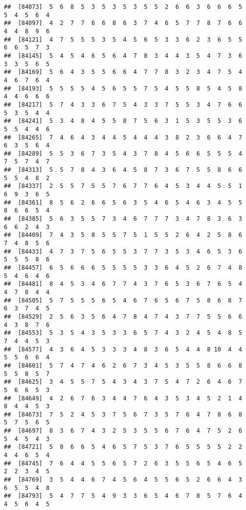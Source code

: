 \documentclass[
]{book}
\begin{document}
\begin{verbatim}
##  [84073]  5  6  8  5  3  5  3  5  3  5  5  2  6  6  3  6  6  6  5  5  4  5  6  4
##  [84097]  4  2  7  7  6  6  8  6  3  7  4  6  5  7  7  8  7  6  6  4  4  8  9  6
##  [84121]  4  7  5  5  5  3  5  4  5  6  5  3  3  6  2  3  6  5  5  6  6  5  7  3
##  [84145]  5  4  5  4  6  5  6  4  7  8  3  4  4  3  5  4  7  3  6  3  3  5  6  5
##  [84169]  5  6  4  3  5  5  6  6  4  7  7  8  3  2  3  4  7  5  4  4  6  7  6  4
##  [84193]  5  5  5  5  4  5  6  5  5  7  5  4  5  5  8  5  4  5  8  4  4  6  6  6
##  [84217]  5  7  4  3  3  6  7  5  4  3  3  7  5  5  3  4  7  6  6  5  3  5  4  4
##  [84241]  5  3  4  8  4  5  5  8  7  5  6  3  1  5  3  5  5  3  6  5  5  4  4  6
##  [84265]  7  4  6  4  3  4  4  5  4  4  4  3  8  2  3  6  6  4  7  6  3  5  6  4
##  [84289]  5  5  3  6  7  3  5  4  3  7  8  4  5  6  6  5  5  5  4  7  5  7  4  7
##  [84313]  5  5  7  8  4  3  6  4  5  8  7  3  6  7  5  5  8  6  6  5  5  4  8  2
##  [84337]  2  5  5  7  5  5  7  6  7  7  6  4  5  3  4  4  5  5  1  6  9  3  6  5
##  [84361]  8  5  6  2  6  6  5  6  3  5  4  6  5  4  6  3  4  5  5  8  6  6  5  4
##  [84385]  5  6  3  5  5  7  3  4  6  7  7  7  3  4  7  8  3  6  3  6  6  2  4  3
##  [84409]  7  4  3  5  8  5  5  7  5  1  5  5  2  6  4  2  5  8  6  7  4  8  5  6
##  [84433]  4  7  3  7  5  6  5  5  3  7  7  3  5  3  4  6  5  3  6  5  5  5  8  6
##  [84457]  6  5  6  6  6  5  5  5  5  3  3  6  4  5  2  6  7  4  8  5  4  6  4  6
##  [84481]  8  4  5  3  4  6  7  7  4  3  7  6  5  3  6  7  6  5  4  4  7  8  4  4
##  [84505]  5  7  5  5  5  6  5  4  6  7  6  5  6  7  5  8  6  8  7  6  3  7  4  5
##  [84529]  2  5  6  3  5  6  4  7  8  4  7  4  3  7  7  5  5  6  6  4  3  8  7  6
##  [84553]  5  3  5  4  3  5  3  3  6  5  7  4  3  2  4  5  4  8  5  7  4  4  5  3
##  [84577]  4  3  6  4  5  3  3  3  4  8  3  6  5  4  4  8 10  4  4  5  5  6  6  4
##  [84601]  5  7  4  7  4  6  2  6  7  3  4  5  3  5  5  8  6  6  8  5  5  8  5  7
##  [84625]  3  4  5  5  7  5  4  3  4  3  7  5  4  7  2  6  4  6  7  5  6  6  5  3
##  [84649]  4  2  6  7  6  3  4  4  7  6  4  3  5  3  4  5  2  1  4  8  4  4  5  3
##  [84673]  7  5  2  4  5  3  7  5  6  7  3  5  7  6  4  7  8  6  8  5  7  5  6  5
##  [84697]  8  3  6  7  4  3  2  5  3  5  5  6  7  6  4  7  5  2  6  5  4  5  4  3
##  [84721]  5  8  6  6  5  4  6  5  7  5  3  7  6  5  5  5  5  2  2  4  4  6  5  4
##  [84745]  7  6  4  4  5  5  6  5  7  2  6  3  5  5  6  5  4  6  5  2  2  3  4  5
##  [84769]  3  5  4  4  6  7  4  5  6  4  5  5  6  5  2  6  6  4  3  6  5  5  4  8
##  [84793]  5  4  7  7  5  4  9  3  3  6  5  4  6  7  8  5  7  6  4  4  5  6  4  5

\end{verbatim}
\end{document}
